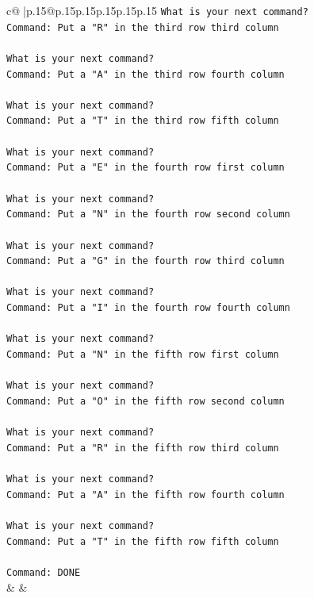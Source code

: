 \documentclass{article}
\begin{document}
{\begin{supertabular}{c@{$\;$}|p{.15\linewidth}@{}p{.15\linewidth}p{.15\linewidth}p{.15\linewidth}p{.15\linewidth}p{.15\linewidth}}
{{{\texttt{What is your next command?} \\
\texttt{Command: Put a "R" in the third row third column} \\
\\ 
\texttt{What is your next command?} \\
\texttt{Command: Put a "A" in the third row fourth column} \\
\\ 
\texttt{What is your next command?} \\
\texttt{Command: Put a "T" in the third row fifth column} \\
\\ 
\texttt{What is your next command?} \\
\texttt{Command: Put a "E" in the fourth row first column} \\
\\ 
\texttt{What is your next command?} \\
\texttt{Command: Put a "N" in the fourth row second column} \\
\\ 
\texttt{What is your next command?} \\
\texttt{Command: Put a "G" in the fourth row third column} \\
\\ 
\texttt{What is your next command?} \\
\texttt{Command: Put a "I" in the fourth row fourth column} \\
\\ 
\texttt{What is your next command?} \\
\texttt{Command: Put a "N" in the fifth row first column} \\
\\ 
\texttt{What is your next command?} \\
\texttt{Command: Put a "O" in the fifth row second column} \\
\\ 
\texttt{What is your next command?} \\
\texttt{Command: Put a "R" in the fifth row third column} \\
\\ 
\texttt{What is your next command?} \\
\texttt{Command: Put a "A" in the fifth row fourth column} \\
\\ 
\texttt{What is your next command?} \\
\texttt{Command: Put a "T" in the fifth row fifth column} \\
\\ 
\texttt{Command: DONE} \\
            }
        }
    }
    & & \\ \\


\end{supertabular}}
\end{document}
